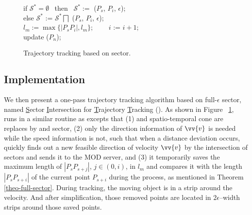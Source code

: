 \begin{figure}[tb!]
\begin{center}
{\begin{minipage}{3.3in}
{					\icc \>\hspace{3ex} if $\mathcal{S}^*=\emptyset$ ~then~ $\mathcal{S}^*:=$ ($P_s$, $P_{i}$, $\epsilon$); \\
					\icc \>\hspace{3ex} else $\mathcal{S}^*$ := $\mathcal{S}^*\bigsqcap$ ($P_s$, $P_{i}$, $\epsilon$);\\
					\icc \>\hspace{3ex} $l_{m} := \max\{|P_sP_{i}|, l_{m}\}$; ~~~~$i$ := $i +1$;\\
					\icc \>\hspace{0ex} update ($P_{n}$); 
				}
				\vspace{-2ex}
				\myhrule
			\end{minipage}
		}
	\end{center}
	\vspace{-2ex}
	\caption{\small Trajectory tracking based on sector.}
	\label{alg:sitt}
	\vspace{-1ex}
\end{figure}

\subsection{Implementation}

We then present a one-pass trajectory tracking algorithm based on full-$\epsilon$ sector, named \underline{S}ector \underline{I}ntersection for \underline{T}rajectory \underline{T}racking (\sitt). As shown in Figure ~\ref{alg:sitt}, \sitt runs in a similar routine as \citt excepts that (1) \sed and spatio-temporal cone are replaces by \ped and sector, (2) only the direction information of $\vv{v}$ is needed while the speed information is not, such that when a distance deviation occurs, \sitt quickly finds out a new feasible direction of velocity $\vv{v}$ by the intersection of sectors and sends it to the MOD server, and (3) it temporarily saves the maximum length of $|P_sP_{s+j}|$, $j\in (0, i)$, in $l_m$ and compares it with the length $|P_sP_{s+i}|$ of the current point $P_{s+i}$ during the process, as mentioned in Theorem \ref{theo-full-sector}. 
%
During tracking, the moving object is in a strip around the velocity. And after simplification, those removed points are located in $2\epsilon$--width strips around those saved points.

